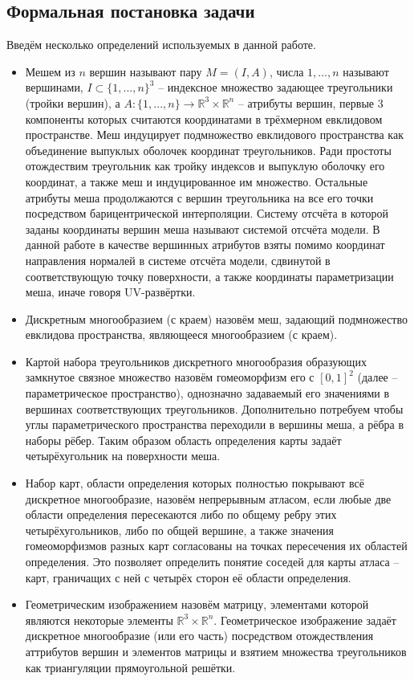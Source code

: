 \documentclass[12pt]{extarticle}
\begin{document}
\subsection{Формальная постановка задачи}
Введём несколько определений используемых в данной работе.
\begin{itemize}
\item Мешем из $n$ вершин называют пару $M = (I, A)$, числа $1,...,n$ называют вершинами, $I \subset \{1, ..., n\}^3$ -- индексное множество задающее треугольники (тройки вершин), а $A: \{1, ..., n\} \rightarrow \mathbb{R}^3 \times \mathbb{R}^n$ -- атрибуты вершин, первые 3 компоненты которых считаются координатами в трёхмерном евклидовом пространстве. Меш индуцирует подмножество евклидового пространства как объединение выпуклых оболочек координат треугольников. Ради простоты отождествим треугольник как тройку индексов и выпуклую оболочку его координат, а также меш и индуцированное им множество. Остальные атрибуты меша продолжаются с вершин треугольника на все его точки посредством барицентрической интерполяции. Систему отсчёта в которой заданы координаты вершин меша называют системой отсчёта модели. В данной работе в качестве вершинных атрибутов взяты помимо координат направления нормалей в системе отсчёта модели, сдвинутой в соответствующую точку поверхности, а также координаты параметризации меша, иначе говоря UV-развёртки.
\item Дискретным многообразием (с краем) назовём меш, задающий подмножество евклидова пространства, являющееся многообразием (с краем).
\item Картой набора треугольников дискретного многообразия образующих замкнутое связное множество назовём гомеоморфизм его с $[0,1]^2$ (далее -- параметрическое пространство), однозначно задаваемый его значениями в вершинах соответствующих треугольников. Дополнительно потребуем чтобы углы параметрического пространства переходили в вершины меша, а рёбра в наборы рёбер. Таким образом область определения карты задаёт четырёхугольник на поверхности меша.
\item Набор карт, области определения которых полностью покрывают всё дискретное многообразие, назовём непрерывным атласом, если любые две области определения пересекаются либо по общему ребру этих четырёхугольников, либо по общей вершине, а также значения гомеоморфизмов разных карт согласованы на точках пересечения их областей определения. Это позволяет определить понятие соседей для карты атласа -- карт, граничащих с ней с четырёх сторон её области определения.
\item Геометрическим изображением назовём матрицу, элементами которой являются некоторые элементы $\mathbb{R}^3\times \mathbb{R}^n$. Геометрическое изображение задаёт дискретное многообразие (или его часть) посредством отождествления аттрибутов вершин и элементов матрицы и взятием множества треугольников как триангуляции прямоугольной решётки.

\end{itemize}
\end{document}
